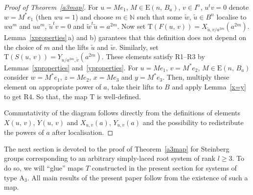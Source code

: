 \documentclass[11pt]{amsart}
\theoremstyle{plain} \declaretheorem[name=Theorem, Refname={Theorem,Theorems}]{tm} \Crefname{tm}{Theorem}{Theorems}
\numberwithin{equation}{section}
\theoremstyle{definition} \newtheorem{df}[lm]{Definition} \Crefname{df}{Definition}{Definitions}
\theoremstyle{remark} \newtheorem{rk}[lm]{Remark} \Crefname{rk}{Remark}{Remarks}
\newcommand{\E}{{\mathrm{E}}}
\begin{document}
\begin{proof}[Proof of Theorem~\ref{a3map}]
For $u=Me_1$, $M\in\E(n,\,B_a)$, $v\in I^n$, $u^tv=0$ denote $w=M^*e_1$ (then $wu=1$) and choose $m\in\mathbb N$ such that some $\tilde w$, $\tilde u\in B^n$ localise to $wa^m$ and $ua^m$, $\tilde u^tv=0$ and $\tilde w^t\tilde u=a^{2m}$. Now set $\mathrm T(F(u,\,v))=X_{\tilde u,v/a^{3m}}(a^{2m})$. Lemma~\ref{xproperties}\,a) and b) garantees that this definition does not depend on the choice of $m$ and the lifts $\tilde u$ and $\tilde w$. Similarly, set $\mathrm T(S(u,\,v))=Y_{u/a^{3m},\tilde v}(a^{2m})$. These elements satisfy R1--R3 by Lemmas~\ref{xproperties} and~\ref{yproperties}. For $u=Me_1$, $v=M^*e_2$, $M\in\E(n,\,B_a)$ consider $w=M^*e_1$, $z=Me_2$, $x=Me_3$ and $y=M^*e_3$. Then, multiply these element on appropriate power of $a$, take their lifts to $B$ and apply Lemma~\ref{x=y} to get R4. So that, the map $\mathrm T$ is well-defined.

Commutativity of the diagram follows directly from the definitions of elements $X(u,\,v)$, $Y(u,\,v)$ and $X_{u,v}(a)$, $Y_{u,v}(a)$ and the possibility to redistribute the powers of $a$ after localisation.
\end{proof}

The next section is devoted to the proof of Theorem~\ref{a3map} for Steinberg groups corresponding to an arbitrary simply-laced root system of rank $l\geq3$. To do so, we will ``glue'' maps $T$ constructed in the present section for systems of type $\mathrm A_3$. All main results of the present paper follow from the existence of such a map.

\printbibliography
\end{document}
